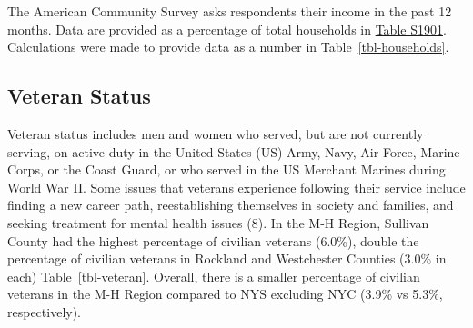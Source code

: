 \documentclass[
  english,
  letterpaper,
]{report}
\begin{document}
\begin{tcolorbox}[enhanced jigsaw, breakable, leftrule=.75mm, title=\textcolor{quarto-callout-note-color}{\faInfo}\hspace{0.5em}{Note}, bottomrule=.15mm, opacityback=0, left=2mm, colback=white, bottomtitle=1mm, coltitle=black, colbacktitle=quarto-callout-note-color!10!white, colframe=quarto-callout-note-color-frame, opacitybacktitle=0.6, toptitle=1mm, titlerule=0mm, arc=.35mm, rightrule=.15mm, toprule=.15mm]

The American Community Survey asks respondents their income in the past
12 months. Data are provided as a percentage of total households in
\href{https://data.census.gov/table/ACSST5Y2023.S1901?q=s1901&g=050XX00US36105,36027,36071,36119,36087,36079,36111_160XX00US3651000_040XX00US36}{Table
S1901}. Calculations were made to provide data as a number in
Table~\ref{tbl-households}.

\end{tcolorbox}

\subsection{Veteran Status}\label{veteran-status}

Veteran status includes men and women who served, but are not currently
serving, on active duty in the United States (US) Army, Navy, Air Force,
Marine Corps, or the Coast Guard, or who served in the US Merchant
Marines during World War II. Some issues that veterans experience
following their service include finding a new career path,
reestablishing themselves in society and families, and seeking treatment
for mental health issues (8). In the M-H Region, Sullivan County had the
highest percentage of civilian veterans (6.0\%), double the percentage
of civilian veterans in Rockland and Westchester Counties (3.0\% in
each) Table~\ref{tbl-veteran}. Overall, there is a smaller percentage of
civilian veterans in the M-H Region compared to NYS excluding NYC (3.9\%
vs 5.3\%, respectively).
\end{document}
